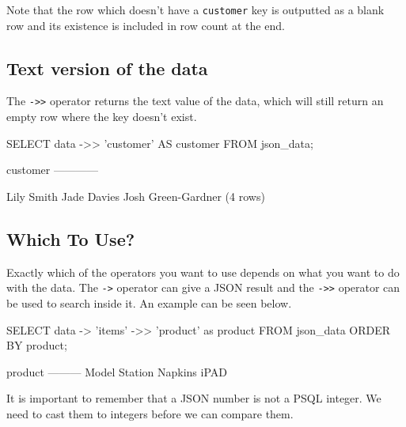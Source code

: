 Note that the row which doesn't have a \verb|customer| key is outputted as a blank row and its existence is included in row count at the end.

\subsection{Text version of the data}
The \verb|->>| operator returns the text value of the data, which will still return an empty row where the key doesn't exist. 
\begin{sql}
SELECT data ->> 'customer' AS customer FROM json_data;
\end{sql}
\begin{pseudo}
customer
------------

Lily Smith
Jade Davies
Josh Green-Gardner
(4 rows)
\end{pseudo}

\subsection{Which To Use?}
Exactly which of the operators you want to use depends on what you want to do with the data. The \verb|->| operator can give a JSON result and the \verb|->>| operator can be used to search inside it. An example can be seen below.
\begin{sql}
SELECT data -> 'items' ->> 'product' as product
FROM json_data ORDER BY product;
\end{sql}
\begin{pseudo}
product
---------
Model Station
Napkins
iPAD
\end{pseudo}

It is important to remember that a JSON number is not a PSQL integer. We need to cast them to integers before we can compare them. 